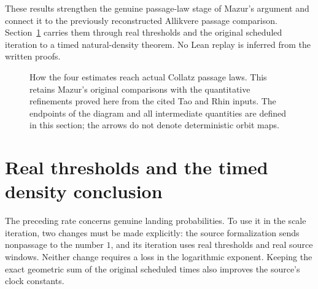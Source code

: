 \documentclass[11pt]{article}
\theoremstyle{remark}\newtheorem{remark}[proposition]{Remark}
\begin{document}
These results strengthen the genuine passage-law stage of Mazur's
argument and connect it to the previously reconstructed Allikvere
passage comparison. Section~\ref{sec:mazur-real-timed} carries them
through real thresholds and the original scheduled iteration to a
timed natural-density theorem. No Lean replay is inferred from the
written proofs.

\begin{figure}[ht]
\centering
{}
\caption{How the four estimates reach actual Collatz passage laws.
This retains Mazur's original comparisons with the quantitative
refinements proved here from the cited Tao and Rhin inputs.
The endpoints of the diagram and all intermediate quantities are defined
in this section; the arrows do not denote deterministic orbit maps.}
\label{fig:mazur-genuine-chain}
\end{figure}

\section{Real thresholds and the timed density conclusion}
\label{sec:mazur-real-timed}

The preceding rate concerns genuine landing probabilities. To use it in
the scale iteration, two changes must be made explicitly: the source
formalization sends nonpassage to the number \(1\), and its iteration
uses real thresholds and real source windows. Neither change requires
a loss in the logarithmic exponent. Keeping the exact geometric sum of
the original scheduled times also improves the source's clock constants.
\end{document}
